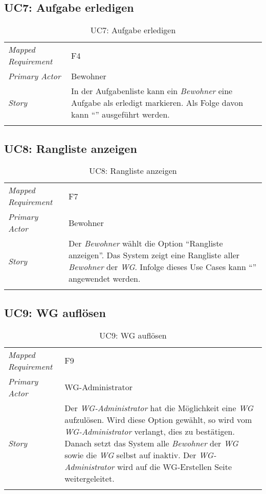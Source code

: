 \subsection{UC7: Aufgabe erledigen}\label{subsec:uc7}
\begin{table}[H]
	\tablestyle
	\tablealtcolored
	\begin{tabularx}{\textwidth}{lX}
		\tablebody
			\textit{Mapped Requirement} &
			F4
			\tabularnewline
			\textit{Primary Actor} &
			Bewohner
			\tabularnewline
			\textit{Story} &
			In der Aufgabenliste kann ein \emph{Bewohner} eine Aufgabe als erledigt markieren.
			\newline Als Folge davon kann ``\nameref{subsec:uc11}'' ausgeführt werden.
			\tabularnewline
		\tableend
	\end{tabularx}
	\caption{UC7: Aufgabe erledigen}
\end{table}


\subsection{UC8: Rangliste anzeigen}\label{subsec:uc8}
\begin{table}[H]
	\tablestyle
	\tablealtcolored
	\begin{tabularx}{\textwidth}{lX}
		\tablebody
			\textit{Mapped Requirement} &
			F7
			\tabularnewline
			\textit{Primary Actor} &
			Bewohner
			\tabularnewline
			\textit{Story} &
			Der \emph{Bewohner} wählt die Option ``Rangliste anzeigen''. Das System zeigt eine Rangliste aller \emph{Bewohner} der \emph{WG}.
			\newline Infolge dieses Use Cases kann ``\nameref{subsec:uc11}'' angewendet werden.
			\tabularnewline
		\tableend
	\end{tabularx}
	\caption{UC8: Rangliste anzeigen}
\end{table}


\subsection{UC9: WG auflösen}\label{subsec:uc9}
\begin{table}[H]
	\tablestyle
	\tablealtcolored
	\begin{tabularx}{\textwidth}{lX}
		\tablebody
			\textit{Mapped Requirement} &
			F9
			\tabularnewline
			\textit{Primary Actor} &
			WG-Administrator
			\tabularnewline
			\textit{Story} &
			Der \emph{WG-Administrator} hat die Möglichkeit eine \emph{WG} aufzulösen. Wird diese Option gewählt, so wird vom \emph{WG-Administrator} verlangt, dies zu bestätigen. Danach setzt das System alle \emph{Bewohner} der \emph{WG} sowie die \emph{WG} selbst auf inaktiv. Der \emph{WG-Administrator} wird auf die WG-Erstellen Seite weitergeleitet.
			\tabularnewline
		\tableend
	\end{tabularx}
	\caption{UC9: WG auflösen}
\end{table}


